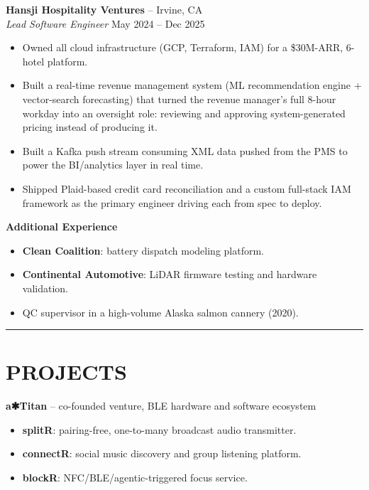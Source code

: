 \documentclass[a4paper,10pt]{article}
\begin{document}
\textbf{Hansji Hospitality Ventures} – Irvine, CA\\
\textit{Lead Software Engineer} \hfill May 2024 – Dec 2025
\begin{itemize}[leftmargin=1.5em]
\item Owned all cloud infrastructure (GCP, Terraform, IAM) for a \$30M-ARR, 6-hotel platform.
\item Built a real-time revenue management system (ML recommendation engine + vector-search forecasting) that turned the revenue manager's full 8-hour workday into an oversight role: reviewing and approving system-generated pricing instead of producing it.
\item Built a Kafka push stream consuming XML data pushed from the PMS to power the BI/analytics layer in real time.
\item Shipped Plaid-based credit card reconciliation and a custom full-stack IAM framework as the primary engineer driving each from spec to deploy.
\end{itemize}

\vspace{0.3em}

\textbf{Additional Experience}
\begin{itemize}[leftmargin=1.5em]
\item \textbf{Clean Coalition}: battery dispatch modeling platform.
\item \textbf{Continental Automotive}: LiDAR firmware testing and hardware validation.
\item QC supervisor in a high-volume Alaska salmon cannery (2020).
\end{itemize}

\noindent\rule{\textwidth}{0.4pt}

\section*{PROJECTS}

\textbf{a{\symbolfont ✱}Titan} – co-founded venture, BLE hardware and software ecosystem
\begin{itemize}[leftmargin=1.5em]
\item \textbf{splitR}: pairing-free, one-to-many broadcast audio transmitter.
\item \textbf{connectR}: social music discovery and group listening platform.
\item \textbf{blockR}: NFC/BLE/agentic-triggered focus service.
\end{itemize}
\end{document}
